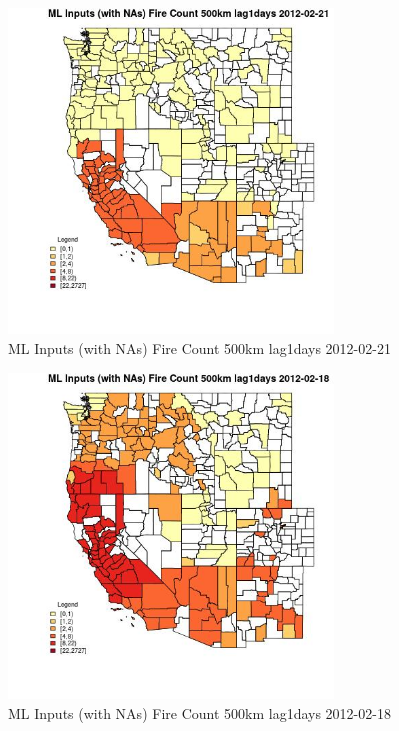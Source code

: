 \begin{figure} 
\centering  
\includegraphics[width=0.77\textwidth]{Code_Outputs/Report_ML_input_PM25_Step4_part_f_de_duplicated_aveswNAs_CountyFire_Count_500km_lag1daysMean2012-02-21.jpg} 
\caption{\label{fig:Report_ML_input_PM25_Step4_part_f_de_duplicated_aveswNAsCountyFire_Count_500km_lag1daysMean2012-02-21}ML Inputs (with NAs) Fire Count 500km lag1days 2012-02-21} 
\end{figure} 
 

\begin{figure} 
\centering  
\includegraphics[width=0.77\textwidth]{Code_Outputs/Report_ML_input_PM25_Step4_part_f_de_duplicated_aveswNAs_CountyFire_Count_500km_lag1daysMean2012-02-18.jpg} 
\caption{\label{fig:Report_ML_input_PM25_Step4_part_f_de_duplicated_aveswNAsCountyFire_Count_500km_lag1daysMean2012-02-18}ML Inputs (with NAs) Fire Count 500km lag1days 2012-02-18} 
\end{figure} 
 

